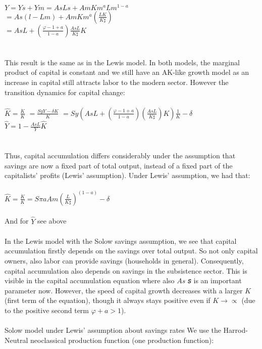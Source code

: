 \documentclass[10pnt]{article}
\begin{document}
	\\
	$Y=Ys+Ym = AsLs+AmKm^aLm^{1-a}$
	\\
	$
	= As(l-Lm)+AmKm^a(\frac{LK}{K\sharp})
	$
	\\
	$
	= AsL+(\frac{\varphi-1+a}{1-a})\frac{AsL}{K\sharp}K
	$
	\\
	\\
	\\
	This result is the same as in the Lewis model. In both models, the marginal product of capital is constant
	and we still have an AK-like growth model as an increase in capital still attracts labor to the modern sector.
	However the transition dynamics for capital change:
	\\
	\\
	$\widehat{K}=
	\frac{\dot{K}}{K}
	$
	$= \frac{SyY-\delta{K}}{K}
	$
	$= Sy(AsL+(\frac{\varphi-1+a}{1-a})(\frac{AsL}{K\sharp})K)\frac{1}{K}-\delta
	$
	\\
	$\widehat{Y}=
	1-\frac{AsL}{Y}\widehat{K}$
	\\
	\\
	\\
	Thus, capital accumulation differs considerably under the assumption that savings are now a fixed part
	of total output, instead of a fixed part of the capitalists’ profits (Lewis’ assumption).
	Under Lewis’ assumption, we had that:
	\\
	\\
	$ \widehat{K}= 
	\frac{\dot{K}}{K} = S\pi aAm(\frac{L}{K\sharp})^(1-a)-\delta
	$
	\\
	\\
	And for $\widehat{Y}$ see above
	\\
	\\
	In the Lewis model with the Solow savings assumption, we see that capital accumulation firstly depends
	on the savings over total output. So not only capital owners, also labor can provide savings (households
	in general). Consequently, capital accumulation also depends on savings in the subsistence sector. This is
	visible in the capital accumulation equation where also	$As$ 𝑠
	is an important parameter now. However, the
	speed of capital growth decreases with a larger $K$  (first term of the equation), though it always stays
	positive even if $K\rightarrow\propto$  (due to the positive second term $ \varphi+a>1 $).
	\\
	\\
	Solow model under Lewis’ assumption about savings rates
	We use the Harrod-Neutral neoclassical production function (one production function):
\end{document}
